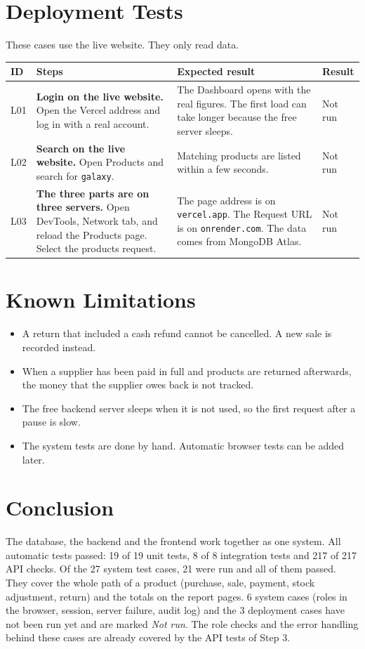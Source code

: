 \documentclass[11pt,a4paper]{article}
\newcommand{\code}[1]{\texttt{#1}}
\begin{document}
\section{Deployment Tests}
These cases use the live website. They only read data.
\begin{longtable}{@{}P{0.75cm}P{6.0cm}P{5.3cm}P{1.3cm}@{}}
\toprule
\textbf{ID} & \textbf{Steps} & \textbf{Expected result} & \textbf{Result} \\
\midrule
\endhead
L01 & \textbf{Login on the live website.} Open the Vercel address and log in with a real account. & The Dashboard opens with the real figures. The first load can take longer because the free server sleeps. & Not run \\\addlinespace
L02 & \textbf{Search on the live website.} Open Products and search for \code{galaxy}. & Matching products are listed within a few seconds. & Not run \\\addlinespace
L03 & \textbf{The three parts are on three servers.} Open DevTools, Network tab, and reload the Products page. Select the products request. & The page address is on \code{vercel.app}. The Request URL is on \code{onrender.com}. The data comes from MongoDB Atlas. & Not run \\*
\bottomrule
\end{longtable}

\section{Known Limitations}
\begin{itemize}
  \item A return that included a cash refund cannot be cancelled. A new sale is recorded instead.
  \item When a supplier has been paid in full and products are returned afterwards, the money that the supplier owes back is not tracked.
  \item The free backend server sleeps when it is not used, so the first request after a pause is slow.
  \item The system tests are done by hand. Automatic browser tests can be added later.
\end{itemize}

\section{Conclusion}
The database, the backend and the frontend work together as one system. All automatic tests passed: 19 of 19 unit tests, 8 of 8 integration tests and 217 of 217 API checks. Of the 27 system test cases, 21 were run and all of them passed. They cover the whole path of a product (purchase, sale, payment, stock adjustment, return) and the totals on the report pages. 6 system cases (roles in the browser, session, server failure, audit log) and the 3 deployment cases have not been run yet and are marked \emph{Not run}. The role checks and the error handling behind these cases are already covered by the API tests of Step 3.
\end{document}
